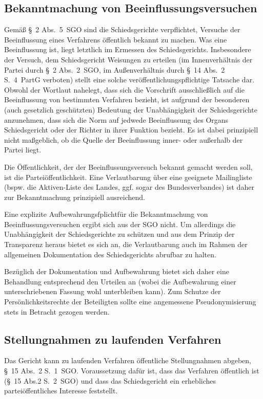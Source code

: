 \subsection{Bekanntmachung von Beeinflussungsversuchen}
\label{Dokumentation:Veröffentlichungen:Beeinflussungen}
Gemäß \S~2 Abs.~5~SGO sind die Schiedsgerichte verpflichtet, Versuche der Beeinflussung eines Verfahrens öffentlich bekannt zu machen.
Was eine Beeinflussung ist, liegt letztlich im Ermessen des Schiedsgerichts.
Insbesondere der Versuch, dem Schiedsgericht Weisungen zu erteilen (im Innenverhältnis der Partei durch \S~2 Abs.~2~SGO, im Außenverhältnis durch \S~14 Abs.~2 S.~4~PartG verboten) stellt eine solche veröffentlichungspflichtige Tatsache dar.
Obwohl der Wortlaut nahelegt, dass sich die Vorschrift ausschließlich auf die Beeinflussung von bestimmten Verfahren bezieht, ist aufgrund der besonderen (auch gesetzlich geschützten) Bedeutung der Unabhängigkeit der Schiedsgerichte anzunehmen, dass sich die Norm auf jedwede Beeinflussung des Organs Schiedsgericht oder der Richter in ihrer Funktion bezieht.
Es ist dabei prinzipiell nicht maßgeblich, ob die Quelle der Beeinflussung inner- oder außerhalb der Partei liegt.

Die Öffentlichkeit, der der Beeinflussungsversuch bekannt gemacht werden soll, ist die Parteiöffentlichkeit.
Eine Verlautbarung über eine geeignete Mailingliste (bspw. die Aktiven-Liste des Landes, ggf. sogar des Bundesverbandes) ist daher zur Bekanntmachung prinzipiell ausreichend.

Eine explizite Aufbewahrungsfplichtfür die Bekanntmachung von Beeinflussungsversuchen ergibt sich aus der SGO nicht.
Um allerdings die Unabhängigkeit der Schiedsgerichte zu schützen und aus dem Prinzip der Transparenz heraus bietet es sich an, die Verlautbarung auch im Rahmen der allgemeinen Dokumentation des Schiedsgerichts abrufbar zu halten.

Bezüglich der Dokumentation und Aufbewahrung bietet sich daher eine Behandlung entsprechend den Urteilen an (wobei die Aufbewahrung einer unterschriebenen Fassung wohl unterbleiben kann).
Zum Schutze der Persönlichkeitsrechte der Beteiligten sollte eine angemessene Pseudonymisierung stets in Betracht gezogen werden.

\subsection{Stellungnahmen zu laufenden Verfahren}
\label{Dokumentation:Veröffentlichungen:Stellungnahmen}
Das Gericht kann zu laufenden Verfahren öffentliche Stellungnahmen abgeben, \S~15 Abs.~2 S.~1~SGO.
Voraussetzung dafür ist, dass das Verfahren öffentlich ist (\S~15 Abs.2 S.~2~SGO) und dass das Schiedsgericht ein erhebliches parteiöffentliches Interesse feststellt.

